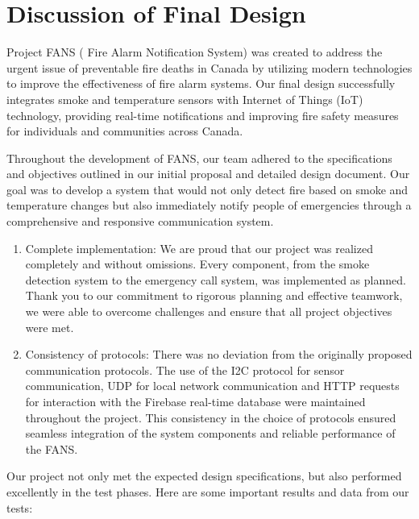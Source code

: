 \section{Discussion of Final Design}

Project FANS ( Fire Alarm Notification System) was created to address the urgent issue of preventable fire deaths in
Canada by utilizing modern technologies to improve the effectiveness of fire alarm systems. Our final design
successfully integrates smoke and temperature sensors with Internet of Things (IoT) technology, providing real-time
notifications and improving fire safety measures for individuals and communities across Canada.

Throughout the development of FANS, our team adhered to the specifications and objectives outlined in our initial
proposal and detailed design document. Our goal was to develop a system that would not only detect fire based on smoke
and temperature changes but also immediately notify people of emergencies through a comprehensive and responsive
communication system.

\begin{enumerate}
    \item Complete implementation: We are proud that our project was realized completely and without omissions. Every component, from the smoke detection system to the emergency call system, was implemented as planned. Thank you to our commitment to rigorous planning and effective teamwork, we were able to overcome challenges and ensure that all project objectives were met.
    \item Consistency of protocols: There was no deviation from the originally proposed communication protocols. The use of the I2C protocol for sensor communication, UDP for local network communication and HTTP requests for interaction with the Firebase real-time database were maintained throughout the project. This consistency in the choice of protocols ensured seamless integration of the system components and reliable performance of the FANS.
\end{enumerate}

Our project not only met the expected design specifications, but also performed excellently in the test phases. Here are
some important results and data from our tests:

